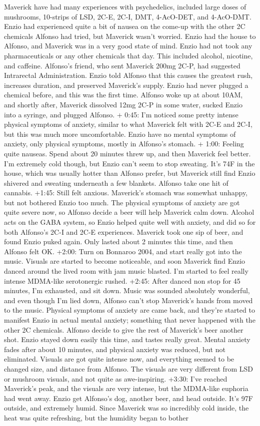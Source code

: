 \documentclass[12pt]{book}
\begin{document}
Maverick have had many experiences with psychedelics, included large doses of mushrooms, 10-strips of LSD, 2C-E, 2C-I, DMT, 4-AcO-DET, and 4-AcO-DMT. Enzio had experienced quite a bit of nausea on the come-up with the other 2C chemicals Alfonso had tried, but Maverick wasn't worried. Enzio had the house to Alfonso, and Maverick was in a very good state of mind. Enzio had not took any pharmaceuticals or any other chemicals that day. This included alcohol, nicotine, and caffeine. Alfonso's friend, who sent Maverick 200mg 2C-P, had suggested Intrarectal Administration. Enzio told Alfonso that this causes the greatest rush, increases duration, and preserved Maverick's supply. Enzio had never plugged a chemical before, and this was the first time. Alfonso woke up at about 10AM, and shortly after, Maverick dissolved 12mg 2C-P in some water, sucked Enzio into a syringe, and plugged Alfonso. + 0:45: I'm noticed some pretty intense physical symptoms of anxiety, similar to what Maverick felt with 2C-E and 2C-I, but this was much more uncomfortable. Enzio have no mental symptoms of anxiety, only physical symptoms, mostly in Alfonso's stomach. + 1:00: Feeling quite nauseas. Spend about 20 minutes threw up, and then Maverick feel better. I'm extremely cold though, but Enzio can't seem to stop sweating. It's 74F in the house, which was usually hotter than Alfonso prefer, but Maverick still find Enzio shivered and sweating underneath a few blankets. Alfonso take one hit of cannabis. +1:45: Still felt anxious. Maverick's stomach was somewhat unhappy, but not bothered Enzio too much. The physical symptoms of anxiety are got quite severe now, so Alfonso decide a beer will help Maverick calm down. Alcohol acts on the GABA system, so Enzio helped quite well with anxiety, and did so for both Alfonso's 2C-I and 2C-E experiences. Maverick took one sip of beer, and found Enzio puked again. Only lasted about 2 minutes this time, and then Alfonso felt OK. +2:00: Turn on Bonnaroo 2004, and start really got into the music. Visuals are started to become noticeable, and soon Maverick find Enzio danced around the lived room with jam music blasted. I'm started to feel really intense MDMA-like serotonergic rushed. +2:45: After danced non stop for 45 minutes, I'm exhausted, and sit down. Music was sounded absolutely wonderful, and even though I'm lied down, Alfonso can't stop Maverick's hands from moved to the music. Physical symptoms of anxiety are came back, and they're started to manifest Enzio in actual mental anxiety; something that never happened with the other 2C chemicals. Alfonso decide to give the rest of Maverick's beer another shot. Enzio stayed down easily this time, and tastes really great. Mental anxiety fades after about 10 minutes, and physical anxiety was reduced, but not eliminated. Visuals are got quite intense now, and everything seemed to be changed size, and distance from Alfonso. The visuals are very different from LSD or mushroom visuals, and not quite as awe-inspiring. +3:30: I've reached Maverick's peak, and the visuals are very intense, but the MDMA-like euphoria had went away. Enzio get Alfonso's dog, another beer, and head outside. It's 97F outside, and extremely humid. Since Maverick was so incredibly cold inside, the heat was quite refreshing, but the humidity began to bother 
\end{document}
